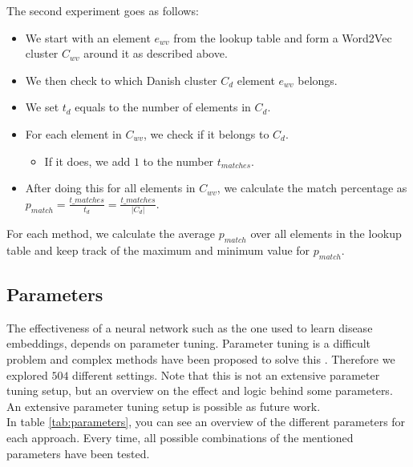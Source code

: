 \noindent The second experiment goes as follows:

\begin{itemize}

\item We start with an element $e_{wv}$ from the lookup table and form a Word2Vec cluster $C_{wv}$ around it as described above.
\item We then check to which Danish cluster $C_d$ element $e_{wv}$ belongs.
\item We set $t_{d}$ equals to the number of elements in $C_d$.
\item For each element in $C_{wv}$, we check if it belongs to $C_d$.
\begin{itemize}
\item If it does, we add $1$ to the number $t_{matches}$.
\end{itemize}
\item After doing this for all elements in $C_{wv}$, we calculate the match percentage as $p_{match} = \frac{t\_{matches}}{t_{d}} = \frac{t\_{matches}}{\left| C_{d} \right|}$.

\end{itemize}

For each method, we calculate the average $p_{match}$ over all elements in the lookup table and keep track of the maximum and minimum value for $p_{match}$.


\subsection{Parameters}
\label{sec:parameters}

The effectiveness of a neural network such as the one used to learn disease embeddings, depends on parameter tuning. Parameter tuning is a difficult problem and complex methods have been proposed to solve this \cite{tuning:article}. Therefore we explored $504$ different settings. Note that this is not an extensive parameter tuning setup, but an overview on the effect and logic behind some parameters. An extensive parameter tuning setup is possible as future work. \\

In table \ref{tab:parameters}, you can see an overview of the different parameters for each approach. Every time, all possible combinations of the mentioned parameters have been tested. \\

